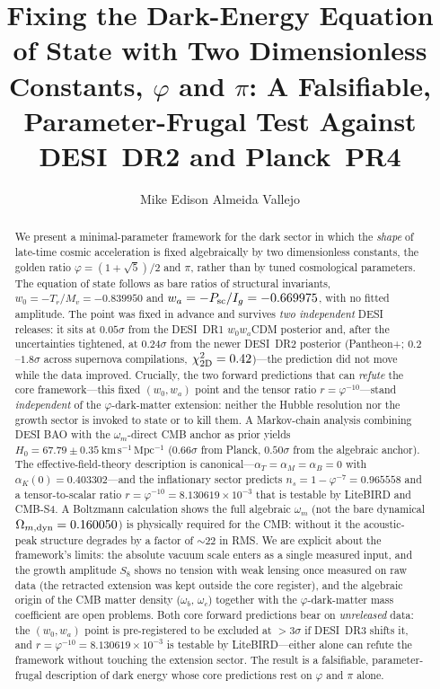 \documentclass[aps,prd,preprint,amsmath,amssymb,nofootinbib,longbibliography]{revtex4-2}
\newcommand{\kms}{\mathrm{km\,s^{-1}\,Mpc^{-1}}}
\begin{document}
\title{Fixing the Dark-Energy Equation of State with Two Dimensionless Constants,
$\varphi$ and $\pi$: A Falsifiable, Parameter-Frugal Test Against DESI~DR2 and Planck~PR4}

\author{Mike Edison Almeida Vallejo}

\begin{abstract}
We present a minimal-parameter framework for the dark sector in which the
\emph{shape} of late-time cosmic acceleration is fixed algebraically by two
dimensionless constants, the golden ratio $\varphi=(1+\sqrt5)/2$ and $\pi$,
rather than by tuned cosmological parameters. The equation of state follows as
bare ratios of structural invariants, $w_0=-T_r/M_v=-0.839950$ and
$w_a=-P_{\rm sc}/I_g=-0.669975$, with no fitted amplitude. The point was fixed in
advance and survives \emph{two independent} DESI releases: it sits at
$0.05\sigma$ from the DESI~DR1 $w_0w_a$CDM posterior and, after the uncertainties
tightened, at $0.24\sigma$ from the newer DESI~DR2 posterior
(Pantheon+; $0.2$--$1.8\sigma$ across supernova compilations,
$\chi^2_{\rm 2D}=0.42$)---the prediction did not move while the data improved.
Crucially, the two forward predictions that can \emph{refute} the core framework---this
fixed $(w_0,w_a)$ point and the tensor ratio $r=\varphi^{-10}$---stand \emph{independent}
of the $\varphi$-dark-matter extension: neither the Hubble resolution nor the growth
sector is invoked to state or to kill them. A Markov-chain analysis combining DESI BAO with the
$\omega_m$-direct CMB anchor as prior yields $H_0=67.79\pm0.35~\kms$
($0.66\sigma$ from Planck, $0.50\sigma$ from the algebraic anchor). The
effective-field-theory description is canonical---$\alpha_T=\alpha_M=\alpha_B=0$
with $\alpha_K(0)=0.403302$---and the inflationary sector predicts
$n_s=1-\varphi^{-7}=0.965558$ and a tensor-to-scalar ratio $r=\varphi^{-10}=
8.130619\times10^{-3}$ that is testable by LiteBIRD and CMB-S4. A Boltzmann
calculation shows the full algebraic $\omega_m$ (not the bare dynamical
$\Omega_{m,\rm dyn}=0.160050$) is physically required for the CMB:
without it the acoustic-peak structure degrades by a factor of $\sim22$ in RMS.
We are explicit about the framework's limits: the absolute vacuum scale enters
as a single measured input, and the growth amplitude $S_8$ shows no tension
with weak lensing once measured on raw data (the retracted extension was
kept outside the core register), and the algebraic origin of the CMB matter
density ($\omega_b$, $\omega_c$) together with the $\varphi$-dark-matter mass
coefficient are open problems. Both core forward predictions bear on
\emph{unreleased} data: the $(w_0,w_a)$ point is pre-registered to be excluded at
$>3\sigma$ if DESI~DR3 shifts it, and $r=\varphi^{-10}=8.130619\times10^{-3}$ is
testable by LiteBIRD---either alone can refute the framework without touching
the extension sector. The result is a falsifiable,
parameter-frugal description of dark energy whose core predictions rest on
$\varphi$ and $\pi$ alone.
\end{abstract}
\end{document}
